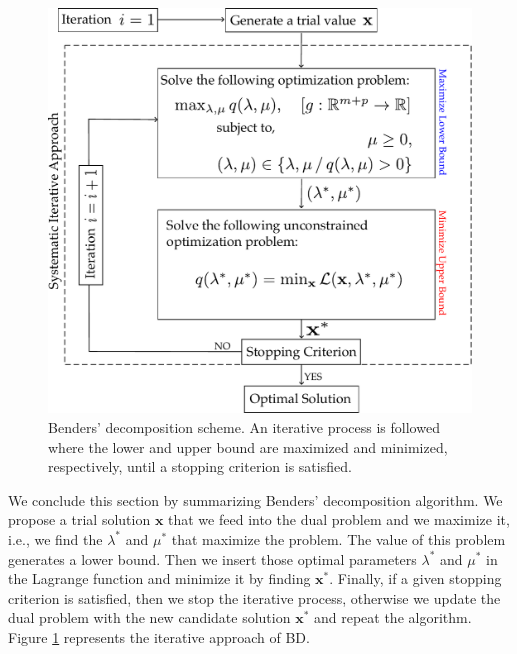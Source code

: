 \begin{figure}[H]
\centering
\includegraphics[width=\textwidth]{Figures/BDScheme.pdf} 
\caption{Benders' decomposition scheme. An iterative process is followed where the lower and upper bound are maximized and minimized, respectively, until a stopping criterion is satisfied.}
\label{fig:BDScheme}
\end{figure}
We conclude this section by summarizing Benders' decomposition algorithm. We propose a trial solution $\mathbf{x}$ that we feed into the dual problem and we maximize it, i.e., we find the $\lambda^{*}$ and $\mu^{*}$ that maximize the problem. The value of this problem generates a lower bound. Then we insert those optimal parameters $\lambda^{*}$ and $\mu^{*}$ in the Lagrange function and minimize it by finding $\mathbf{x}^{*}$. Finally, if a given stopping criterion is satisfied, then we stop the iterative process, otherwise we update the dual problem with the new candidate solution $\mathbf{x}^{*}$ and repeat the algorithm. Figure \ref{fig:BDScheme} represents the iterative approach of BD.
